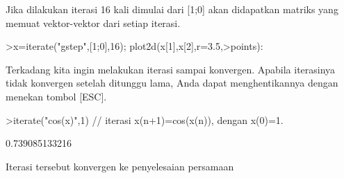 \documentclass{article}
\begin{document}
\begin{eulernotebook}
\begin{eulercomment}
\begin{eulercomment}
\begin{eulercomment}
\begin{eulercomment}
\begin{eulercomment}
\begin{eulercomment}
\begin{eulercomment}
\begin{eulercomment}
\begin{eulerudf}
\end{eulerudf}
\begin{eulercomment}
Jika dilakukan iterasi 16 kali dimulai dari [1;0] akan didapatkan
matriks yang memuat vektor-vektor dari setiap iterasi.
\end{eulercomment}
\begin{eulerprompt}
>x=iterate("gstep",[1;0],16); plot2d(x[1],x[2],r=3.5,>points):
\end{eulerprompt}
\begin{eulercomment}
\begin{eulercomment}
\begin{eulercomment}
Terkadang kita ingin melakukan iterasi sampai konvergen. Apabila
iterasinya tidak konvergen setelah ditunggu lama, Anda dapat
menghentikannya dengan menekan tombol [ESC].
\end{eulercomment}
\begin{eulerprompt}
>iterate("cos(x)",1) // iterasi x(n+1)=cos(x(n)), dengan x(0)=1.
\end{eulerprompt}
\begin{euleroutput}
  0.739085133216
\end{euleroutput}
\begin{eulercomment}
Iterasi tersebut konvergen ke penyelesaian persamaan


\end{eulercomment}
\end{eulercomment}
\end{eulercomment}
\end{eulercomment}
\end{eulercomment}
\end{eulercomment}
\end{eulercomment}
\end{eulercomment}
\end{eulercomment}
\end{eulercomment}
\end{eulercomment}
\end{eulernotebook}
\end{document}
